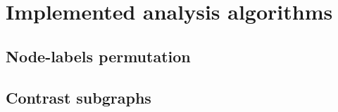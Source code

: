 \section{Implemented analysis algorithms}

\subsection{Node-labels permutation}


\subsection{Contrast subgraphs}

